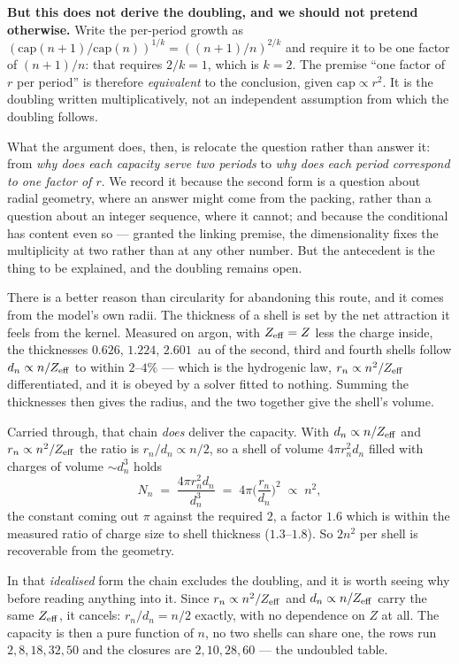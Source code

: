 \documentclass[11pt]{article}
\begin{document}
\textbf{But this does not derive the doubling, and we should not pretend otherwise.} Write the
per-period growth as $(\mathrm{cap}(n{+}1)/\mathrm{cap}(n))^{1/k}=((n{+}1)/n)^{2/k}$ and require it
to be one factor of $(n{+}1)/n$: that requires $2/k=1$, which is $k=2$. The premise ``one factor of
$r$ per period'' is therefore \emph{equivalent} to the conclusion, given $\mathrm{cap}\propto r^2$.
It is the doubling written multiplicatively, not an independent assumption from which the doubling
follows.

What the argument does, then, is relocate the question rather than answer it: from \emph{why does
each capacity serve two periods} to \emph{why does each period correspond to one factor of $r$}. We
record it because the second form is a question about radial geometry, where an answer might come
from the packing, rather than a question about an integer sequence, where it cannot; and because the
conditional has content even so --- granted the linking premise, the dimensionality fixes the
multiplicity at two rather than at any other number. But the antecedent is the thing to be explained,
and the doubling remains open.

There is a better reason than circularity for abandoning this route, and it comes from the model's
own radii. The thickness of a shell is set by the net attraction it feels from the kernel. Measured
on argon, with $Z_{\rm eff}=Z$ less the charge inside, the thicknesses $0.626$, $1.224$, $2.601$~au
of the second, third and fourth shells follow $d_n \propto n/Z_{\rm eff}$ to within $2$--$4\%$ ---
which is the hydrogenic law, $r_n \propto n^2/Z_{\rm eff}$ differentiated, and it is obeyed by a
solver fitted to nothing. Summing the thicknesses then gives the radius, and the two together give
the shell's volume.

Carried through, that chain \emph{does} deliver the capacity. With $d_n\propto n/Z_{\rm eff}$ and
$r_n\propto n^2/Z_{\rm eff}$ the ratio is $r_n/d_n \propto n/2$, so a shell of volume $4\pi r_n^2d_n$
filled with charges of volume ${\sim}d_n^3$ holds
\[
N_n \;=\; \frac{4\pi r_n^2 d_n}{d_n^3} \;=\; 4\pi\Big(\frac{r_n}{d_n}\Big)^{\!2} \;\propto\; n^2 ,
\]
the constant coming out $\pi$ against the required $2$, a factor $1.6$ which is within the measured
ratio of charge size to shell thickness ($1.3$--$1.8$). So $2n^2$ per shell is recoverable from the
geometry.

In that \emph{idealised} form the chain excludes the doubling, and it is worth seeing why before
reading anything into it. Since $r_n\propto n^2/Z_{\rm eff}$ and $d_n\propto n/Z_{\rm eff}$ carry the
same $Z_{\rm eff}$, it cancels: $r_n/d_n=n/2$ exactly, with no dependence on $Z$ at all. The capacity
is then a pure function of $n$, no two shells can share one, the rows run $2,8,18,32,50$ and the
closures are $2,10,28,60$ --- the undoubled table.
\end{document}
